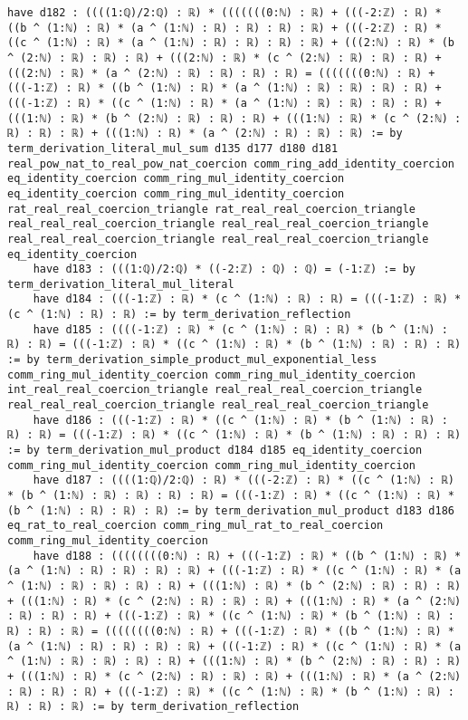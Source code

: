 \documentclass{article}
\begin{document}
\begin{tcolorbox}[colback=white!10, width=\linewidth]
\begin{lstlisting}[language=Lean4]
    have d182 : ((((1:ℚ)/2:ℚ) : ℝ) * (((((((0:ℕ) : ℝ) + (((-2:ℤ) : ℝ) * ((b ^ (1:ℕ) : ℝ) * (a ^ (1:ℕ) : ℝ) : ℝ) : ℝ) : ℝ) + (((-2:ℤ) : ℝ) * ((c ^ (1:ℕ) : ℝ) * (a ^ (1:ℕ) : ℝ) : ℝ) : ℝ) : ℝ) + (((2:ℕ) : ℝ) * (b ^ (2:ℕ) : ℝ) : ℝ) : ℝ) + (((2:ℕ) : ℝ) * (c ^ (2:ℕ) : ℝ) : ℝ) : ℝ) + (((2:ℕ) : ℝ) * (a ^ (2:ℕ) : ℝ) : ℝ) : ℝ) : ℝ) = (((((((0:ℕ) : ℝ) + (((-1:ℤ) : ℝ) * ((b ^ (1:ℕ) : ℝ) * (a ^ (1:ℕ) : ℝ) : ℝ) : ℝ) : ℝ) + (((-1:ℤ) : ℝ) * ((c ^ (1:ℕ) : ℝ) * (a ^ (1:ℕ) : ℝ) : ℝ) : ℝ) : ℝ) + (((1:ℕ) : ℝ) * (b ^ (2:ℕ) : ℝ) : ℝ) : ℝ) + (((1:ℕ) : ℝ) * (c ^ (2:ℕ) : ℝ) : ℝ) : ℝ) + (((1:ℕ) : ℝ) * (a ^ (2:ℕ) : ℝ) : ℝ) : ℝ) := by term_derivation_literal_mul_sum d135 d177 d180 d181 real_pow_nat_to_real_pow_nat_coercion comm_ring_add_identity_coercion eq_identity_coercion comm_ring_mul_identity_coercion eq_identity_coercion comm_ring_mul_identity_coercion rat_real_real_coercion_triangle rat_real_real_coercion_triangle real_real_real_coercion_triangle real_real_real_coercion_triangle real_real_real_coercion_triangle real_real_real_coercion_triangle eq_identity_coercion
    have d183 : (((1:ℚ)/2:ℚ) * ((-2:ℤ) : ℚ) : ℚ) = (-1:ℤ) := by term_derivation_literal_mul_literal
    have d184 : (((-1:ℤ) : ℝ) * (c ^ (1:ℕ) : ℝ) : ℝ) = (((-1:ℤ) : ℝ) * (c ^ (1:ℕ) : ℝ) : ℝ) := by term_derivation_reflection
    have d185 : ((((-1:ℤ) : ℝ) * (c ^ (1:ℕ) : ℝ) : ℝ) * (b ^ (1:ℕ) : ℝ) : ℝ) = (((-1:ℤ) : ℝ) * ((c ^ (1:ℕ) : ℝ) * (b ^ (1:ℕ) : ℝ) : ℝ) : ℝ) := by term_derivation_simple_product_mul_exponential_less comm_ring_mul_identity_coercion comm_ring_mul_identity_coercion int_real_real_coercion_triangle real_real_real_coercion_triangle real_real_real_coercion_triangle real_real_real_coercion_triangle
    have d186 : (((-1:ℤ) : ℝ) * ((c ^ (1:ℕ) : ℝ) * (b ^ (1:ℕ) : ℝ) : ℝ) : ℝ) = (((-1:ℤ) : ℝ) * ((c ^ (1:ℕ) : ℝ) * (b ^ (1:ℕ) : ℝ) : ℝ) : ℝ) := by term_derivation_mul_product d184 d185 eq_identity_coercion comm_ring_mul_identity_coercion comm_ring_mul_identity_coercion
    have d187 : ((((1:ℚ)/2:ℚ) : ℝ) * (((-2:ℤ) : ℝ) * ((c ^ (1:ℕ) : ℝ) * (b ^ (1:ℕ) : ℝ) : ℝ) : ℝ) : ℝ) = (((-1:ℤ) : ℝ) * ((c ^ (1:ℕ) : ℝ) * (b ^ (1:ℕ) : ℝ) : ℝ) : ℝ) := by term_derivation_mul_product d183 d186 eq_rat_to_real_coercion comm_ring_mul_rat_to_real_coercion comm_ring_mul_identity_coercion
    have d188 : ((((((((0:ℕ) : ℝ) + (((-1:ℤ) : ℝ) * ((b ^ (1:ℕ) : ℝ) * (a ^ (1:ℕ) : ℝ) : ℝ) : ℝ) : ℝ) + (((-1:ℤ) : ℝ) * ((c ^ (1:ℕ) : ℝ) * (a ^ (1:ℕ) : ℝ) : ℝ) : ℝ) : ℝ) + (((1:ℕ) : ℝ) * (b ^ (2:ℕ) : ℝ) : ℝ) : ℝ) + (((1:ℕ) : ℝ) * (c ^ (2:ℕ) : ℝ) : ℝ) : ℝ) + (((1:ℕ) : ℝ) * (a ^ (2:ℕ) : ℝ) : ℝ) : ℝ) + (((-1:ℤ) : ℝ) * ((c ^ (1:ℕ) : ℝ) * (b ^ (1:ℕ) : ℝ) : ℝ) : ℝ) : ℝ) = ((((((((0:ℕ) : ℝ) + (((-1:ℤ) : ℝ) * ((b ^ (1:ℕ) : ℝ) * (a ^ (1:ℕ) : ℝ) : ℝ) : ℝ) : ℝ) + (((-1:ℤ) : ℝ) * ((c ^ (1:ℕ) : ℝ) * (a ^ (1:ℕ) : ℝ) : ℝ) : ℝ) : ℝ) + (((1:ℕ) : ℝ) * (b ^ (2:ℕ) : ℝ) : ℝ) : ℝ) + (((1:ℕ) : ℝ) * (c ^ (2:ℕ) : ℝ) : ℝ) : ℝ) + (((1:ℕ) : ℝ) * (a ^ (2:ℕ) : ℝ) : ℝ) : ℝ) + (((-1:ℤ) : ℝ) * ((c ^ (1:ℕ) : ℝ) * (b ^ (1:ℕ) : ℝ) : ℝ) : ℝ) : ℝ) := by term_derivation_reflection

\end{lstlisting}
\end{tcolorbox}
\end{document}
